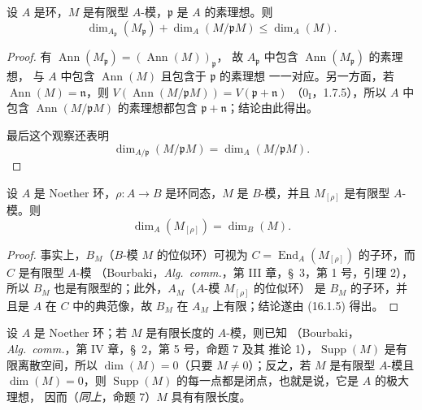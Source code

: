 \begin{proposition}[16.1.8]
\label{0.16.1.8-fr}
设 $A$ 是环，$M$ 是有限型 $A$-模，$\mathfrak{p}$ 是 $A$ 的素理想。则
\[
\label{0.16.1.8.1-fr}
  \dim_{A_{\mathfrak{p}}}(M_{\mathfrak{p}})
  +\dim_A(M/\mathfrak{p}M)\leq\dim_A(M).
\tag{16.1.8.1}
\]
\end{proposition}

\begin{proof}
有
$\operatorname{Ann}(M_{\mathfrak{p}})=(\operatorname{Ann}(M))_{\mathfrak{p}}$，
故 $A_{\mathfrak{p}}$ 中包含 $\operatorname{Ann}(M_{\mathfrak{p}})$ 的素理想，
与 $A$ 中包含 $\operatorname{Ann}(M)$ 且包含于 $\mathfrak{p}$ 的素理想
一一对应。另一方面，若 $\operatorname{Ann}(M)=\mathfrak{n}$，则
$V(\operatorname{Ann}(M/\mathfrak{p}M))=V(\mathfrak{p}+\mathfrak{n})$
（$0_{\mathrm I}$，1.7.5），所以 $A$ 中包含
$\operatorname{Ann}(M/\mathfrak{p}M)$ 的素理想都包含
$\mathfrak{p}+\mathfrak{n}$；结论由此得出。

最后这个观察还表明
\[
\label{0.16.1.8.2-fr}
  \dim_{A/\mathfrak{p}}(M/\mathfrak{p}M)=\dim_A(M/\mathfrak{p}M).
\tag{16.1.8.2}
\]
\end{proof}

\begin{proposition}[16.1.9]
\label{0.16.1.9-fr}
设 $A$ 是 Noether 环，$\rho:A\to B$ 是环同态，$M$ 是 $B$-模，并且
$M_{[\rho]}$ 是有限型 $A$-模。则
\[
\label{0.16.1.9.1-fr}
  \dim_A(M_{[\rho]})=\dim_B(M).
\tag{16.1.9.1}
\]
\end{proposition}

\begin{proof}
事实上，$B_M$（$B$-模 $M$ 的位似环）可视为
$C=\operatorname{End}_A(M_{[\rho]})$ 的子环，而 $C$ 是有限型 $A$-模
（Bourbaki，\emph{Alg.~comm.}，第 III 章，\S~3，第 1 号，引理 2），
所以 $B_M$ 也是有限型的；此外，$A_M$（$A$-模 $M_{[\rho]}$ 的位似环）
是 $B_M$ 的子环，并且是 $A$ 在 $C$ 中的典范像，故 $B_M$ 在 $A_M$
上有限；结论遂由 (16.1.5) 得出。
\end{proof}

\begin{env}[16.1.10]
\label{0.16.1.10-fr}
设 $A$ 是 Noether 环；若 $M$ 是有限长度的 $A$-模，则已知
（Bourbaki，\emph{Alg.~comm.}，第 IV 章，\S~2，第 5 号，命题 7 及其
推论 1），$\operatorname{Supp}(M)$ 是有限离散空间，所以
$\dim(M)=0$（只要 $M\neq0$）；反之，若 $M$ 是有限型 $A$-模且
$\dim(M)=0$，则
$\operatorname{Supp}(M)$ 的每一点都是闭点，也就是说，它是 $A$ 的极大理想，
因而（\emph{同上}，命题 7）$M$ 具有有限长度。
\end{env}

